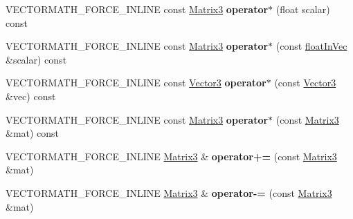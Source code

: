 \begin{DoxyCompactItemize}
\item 
\mbox{\label{classVectormath_1_1Aos_1_1Matrix3_a5661faaa7682489bb641c449a4cf0f3e}} 
V\+E\+C\+T\+O\+R\+M\+A\+T\+H\+\_\+\+F\+O\+R\+C\+E\+\_\+\+I\+N\+L\+I\+NE const \hyperlink{classVectormath_1_1Aos_1_1Matrix3}{Matrix3} {\bfseries operator$\ast$} (float scalar) const
\item 
\mbox{\label{classVectormath_1_1Aos_1_1Matrix3_a364d5ecc6016ed7007adf39ebdfc6253}} 
V\+E\+C\+T\+O\+R\+M\+A\+T\+H\+\_\+\+F\+O\+R\+C\+E\+\_\+\+I\+N\+L\+I\+NE const \hyperlink{classVectormath_1_1Aos_1_1Matrix3}{Matrix3} {\bfseries operator$\ast$} (const \hyperlink{classVectormath_1_1floatInVec}{float\+In\+Vec} \&scalar) const
\item 
\mbox{\label{classVectormath_1_1Aos_1_1Matrix3_af6a8d61a7e89af4b747e4b8d642e6fe8}} 
V\+E\+C\+T\+O\+R\+M\+A\+T\+H\+\_\+\+F\+O\+R\+C\+E\+\_\+\+I\+N\+L\+I\+NE const \hyperlink{classVectormath_1_1Aos_1_1Vector3}{Vector3} {\bfseries operator$\ast$} (const \hyperlink{classVectormath_1_1Aos_1_1Vector3}{Vector3} \&vec) const
\item 
\mbox{\label{classVectormath_1_1Aos_1_1Matrix3_a8aa941e77da62bae02460d4a187963e9}} 
V\+E\+C\+T\+O\+R\+M\+A\+T\+H\+\_\+\+F\+O\+R\+C\+E\+\_\+\+I\+N\+L\+I\+NE const \hyperlink{classVectormath_1_1Aos_1_1Matrix3}{Matrix3} {\bfseries operator$\ast$} (const \hyperlink{classVectormath_1_1Aos_1_1Matrix3}{Matrix3} \&mat) const
\item 
\mbox{\label{classVectormath_1_1Aos_1_1Matrix3_a1b9b7766e7b99453297660db121c5af7}} 
V\+E\+C\+T\+O\+R\+M\+A\+T\+H\+\_\+\+F\+O\+R\+C\+E\+\_\+\+I\+N\+L\+I\+NE \hyperlink{classVectormath_1_1Aos_1_1Matrix3}{Matrix3} \& {\bfseries operator+=} (const \hyperlink{classVectormath_1_1Aos_1_1Matrix3}{Matrix3} \&mat)
\item 
\mbox{\label{classVectormath_1_1Aos_1_1Matrix3_a89abdf48eecd9bbcb786282ce3f89225}} 
V\+E\+C\+T\+O\+R\+M\+A\+T\+H\+\_\+\+F\+O\+R\+C\+E\+\_\+\+I\+N\+L\+I\+NE \hyperlink{classVectormath_1_1Aos_1_1Matrix3}{Matrix3} \& {\bfseries operator-\/=} (const \hyperlink{classVectormath_1_1Aos_1_1Matrix3}{Matrix3} \&mat)

\end{DoxyCompactItemize}
